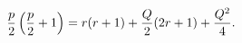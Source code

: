\begin{equation}
{p\over 2}\left({p\over 2}+1\right)=r(r+1)+{Q\over 2}(2r+1) + {Q^2\over 4}.
\end{equation}

